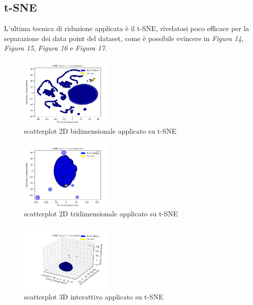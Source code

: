 \documentclass[11pt,a4paper,twocolumn]{article}
\begin{document}
    \subsection{t-SNE}

    L'ultima tecnica di riduzione applicata è il t-SNE, rivelatosi poco efficace per la separazione dei data point del dataset, come è possibile evincere in \emph{Figura 14}, \emph{Figura 15}, \emph{Figura 16} e \emph{Figura 17}.

	\begin{figure}[H]
		\centering
		\includegraphics[width=0.4\textwidth]{img/tSNE_2Dnc2.png}
		\caption{scatterplot 2D bidimensionale applicato su t-SNE}
	\end{figure}

	\begin{figure}[H]
		\centering
		\includegraphics[width=0.4\textwidth]{img/tSNE_2Dnc3.png}
		\caption{scatterplot 2D tridimensionale applicato su t-SNE}
	\end{figure}

	\begin{figure}[H]
		\centering
		\includegraphics[width=0.4\textwidth]{img/tSNE_i3D.png}
		\caption{scatterplot 3D interattivo applicato su t-SNE}
	\end{figure}
\end{document}
